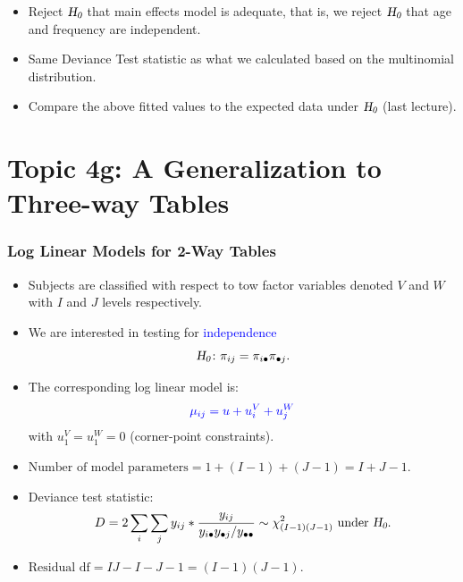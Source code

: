 \documentclass[oneside]{book}\usepackage[]{graphicx}\usepackage[svgnames]{xcolor}
\let\log\relax%
\newcommand{\HN}{\textsl{H}_{\textsl{0}}}%
\begin{document}
\begin{itemize}
    \item Reject $ \HN $ that main effects model is adequate, that is, we reject $ \HN $
          that age and frequency are independent.
    \item Same Deviance Test statistic as what we calculated based on the multinomial
          distribution.
    \item Compare the above fitted values to the expected data under $ \HN $ (last lecture).
\end{itemize}

\section*{Topic 4g: A Generalization to Three-way Tables}
\subsubsection*{Log Linear Models for 2-Way Tables}
\begin{itemize}
    \item Subjects are classified with respect to tow factor variables denoted $V$ and $W$ with
          $I$ and $J$ levels respectively.
    \item We are interested in testing for \textcolor{Blue}{independence}
          \[ \HN\colon \pi_{ij}=\pi_{i\bullet}\pi_{\bullet j}. \]
    \item The corresponding log linear model is:
          \[ \textcolor{Blue}{\log{\mu_{ij}}=u+u_i^V+u_j^W} \]
          with $ u_1^V=u_1^W=0 $ (corner-point constraints).
    \item $ \text{Number of model parameters}=1+(I-1)+(J-1)=I+J-1 $.
    \item Deviance test statistic:
          \[ D=2\sum_i\sum_j y_{ij}\log*{\frac{y_{ij}}{y_{i\bullet}y_{\bullet j}/y_{\bullet\bullet}}} \sim \chi^2_{(I-1)(J-1)}\text{ under $ \HN $}. \]
    \item $ \text{Residual df}=IJ-I-J-1=(I-1)(J-1) $.
\end{itemize}
\end{document}
